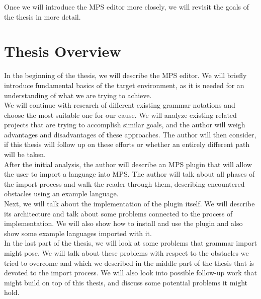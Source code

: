 Once we will introduce the MPS editor more closely, we will revisit the goals of the thesis in more detail.

\section{Thesis Overview}

In the beginning of the thesis, we will describe the MPS editor.
We will briefly introduce fundamental basics of the target environment, as it is needed for an understanding of what we are trying to achieve.
\\

We will continue with research of different existing grammar notations and choose the most suitable one for our cause.
We will analyze existing related projects that are trying to accomplish similar goals, and the author will weigh advantages and disadvantages of these approaches.
The author will then consider, if this thesis will follow up on these efforts or whether an entirely different path will be taken.
\\

After the initial analysis, the author will describe an MPS plugin that will allow the user to import a language into MPS.
The author will talk about all phases of the import process and walk the reader through them, describing encountered obstacles using an example language.
\\

Next, we will talk about the implementation of the plugin itself.
We will describe its architecture and talk about some problems connected to the process of implementation.
We will also show how to install and use the plugin and also show some example languages imported with it.
\\

In the last part of the thesis, we will look at some problems that grammar import might pose.
We will talk about these problems with respect to the obstacles we tried to overcome and which we described in the middle part of the thesis that is devoted to the import process.
We will also look into possible follow-up work that might build on top of this thesis, and discuss some potential problems it might hold.
